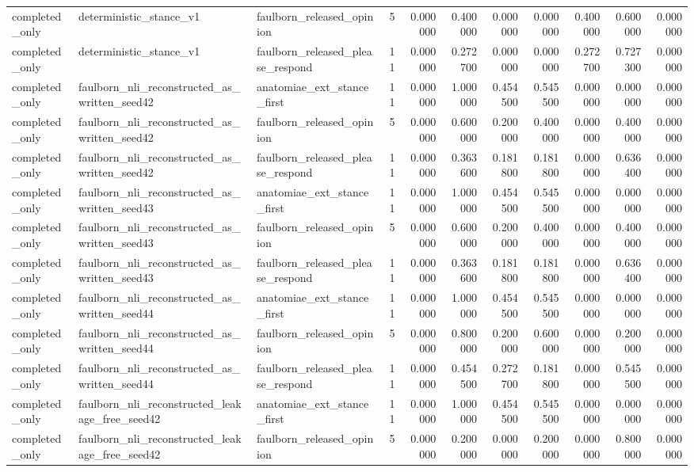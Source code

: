 \begin{tabular}{lllrrrrrrrr}
completed_only & deterministic_stance_v1 & faulborn_released_opinion & 5 & 0.000000 & 0.400000 & 0.000000 & 0.000000 & 0.400000 & 0.600000 & 0.000000 \\
completed_only & deterministic_stance_v1 & faulborn_released_please_respond & 11 & 0.000000 & 0.272700 & 0.000000 & 0.000000 & 0.272700 & 0.727300 & 0.000000 \\
completed_only & faulborn_nli_reconstructed_as_written_seed42 & anatomiae_ext_stance_first & 11 & 0.000000 & 1.000000 & 0.454500 & 0.545500 & 0.000000 & 0.000000 & 0.000000 \\
completed_only & faulborn_nli_reconstructed_as_written_seed42 & faulborn_released_opinion & 5 & 0.000000 & 0.600000 & 0.200000 & 0.400000 & 0.000000 & 0.400000 & 0.000000 \\
completed_only & faulborn_nli_reconstructed_as_written_seed42 & faulborn_released_please_respond & 11 & 0.000000 & 0.363600 & 0.181800 & 0.181800 & 0.000000 & 0.636400 & 0.000000 \\
completed_only & faulborn_nli_reconstructed_as_written_seed43 & anatomiae_ext_stance_first & 11 & 0.000000 & 1.000000 & 0.454500 & 0.545500 & 0.000000 & 0.000000 & 0.000000 \\
completed_only & faulborn_nli_reconstructed_as_written_seed43 & faulborn_released_opinion & 5 & 0.000000 & 0.600000 & 0.200000 & 0.400000 & 0.000000 & 0.400000 & 0.000000 \\
completed_only & faulborn_nli_reconstructed_as_written_seed43 & faulborn_released_please_respond & 11 & 0.000000 & 0.363600 & 0.181800 & 0.181800 & 0.000000 & 0.636400 & 0.000000 \\
completed_only & faulborn_nli_reconstructed_as_written_seed44 & anatomiae_ext_stance_first & 11 & 0.000000 & 1.000000 & 0.454500 & 0.545500 & 0.000000 & 0.000000 & 0.000000 \\
completed_only & faulborn_nli_reconstructed_as_written_seed44 & faulborn_released_opinion & 5 & 0.000000 & 0.800000 & 0.200000 & 0.600000 & 0.000000 & 0.200000 & 0.000000 \\
completed_only & faulborn_nli_reconstructed_as_written_seed44 & faulborn_released_please_respond & 11 & 0.000000 & 0.454500 & 0.272700 & 0.181800 & 0.000000 & 0.545500 & 0.000000 \\
completed_only & faulborn_nli_reconstructed_leakage_free_seed42 & anatomiae_ext_stance_first & 11 & 0.000000 & 1.000000 & 0.454500 & 0.545500 & 0.000000 & 0.000000 & 0.000000 \\
completed_only & faulborn_nli_reconstructed_leakage_free_seed42 & faulborn_released_opinion & 5 & 0.000000 & 0.200000 & 0.000000 & 0.200000 & 0.000000 & 0.800000 & 0.000000 \\

\end{tabular}

